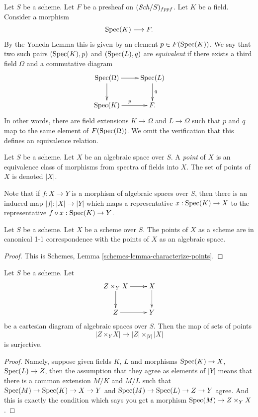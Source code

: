 \medskip\noindent
Let $S$ be a scheme.
Let $F$ be a presheaf on $(\mathit{Sch}/S)_{fppf}$.
Let $K$ be a field. Consider a morphism
$$
\mathop{\mathrm{Spec}}(K) \longrightarrow F.
$$
By the Yoneda Lemma this is given by an
element $p \in F(\mathop{\mathrm{Spec}}(K))$. We say that two such
pairs $(\mathop{\mathrm{Spec}}(K), p)$ and $(\mathop{\mathrm{Spec}}(L), q)$
are {\it equivalent} if there exists
a third field $\Omega$ and a commutative diagram
$$
\xymatrix{
\Spec(\Omega) \ar[r] \ar[d] &
\Spec(L) \ar[d]^q \\
\Spec(K) \ar[r]^p &
F.
}
$$
In other words, there are field extensions
$K \to \Omega$ and $L \to \Omega$ such that
$p$ and $q$ map to the same element
of $F(\mathop{\mathrm{Spec}}(\Omega))$. We omit the verification that this
defines an equivalence relation.

\begin{definition}
\label{definition-points}
Let $S$ be a scheme. Let $X$ be an algebraic space over $S$.
A {\it point} of $X$ is an equivalence class of morphisms
from spectra of fields into $X$.
The set of points of $X$ is denoted $|X|$.
\end{definition}

\noindent
Note that if $f : X \to Y$ is a morphism of algebraic spaces
over $S$, then there is an induced map $|f| : |X| \to |Y|$ which
maps a representative $x : \mathop{\mathrm{Spec}}(K) \to X$ to the representative
$f \circ x : \mathop{\mathrm{Spec}}(K) \to Y$.

\begin{lemma}
\label{lemma-scheme-points}
Let $S$ be a scheme. Let $X$ be a scheme over $S$.
The points of $X$ as a scheme are in canonical 1-1 correspondence
with the points of $X$ as an algebraic space.
\end{lemma}

\begin{proof}
This is Schemes, Lemma \ref{schemes-lemma-characterize-points}.
\end{proof}

\begin{lemma}
\label{lemma-points-cartesian}
Let $S$ be a scheme. Let
$$
\xymatrix{
Z \times_Y X \ar[r] \ar[d] & X \ar[d] \\
Z \ar[r] & Y
}
$$
be a cartesian diagram of algebraic spaces over $S$. Then the map of sets
of points
$$
|Z \times_Y X|
\longrightarrow
|Z| \times_{|Y|} |X|
$$
is surjective.
\end{lemma}

\begin{proof}
Namely, suppose given fields $K$, $L$ and morphisms
$\mathop{\mathrm{Spec}}(K) \to X$, $\mathop{\mathrm{Spec}}(L) \to Z$, then the
assumption that they agree as elements of $|Y|$ means that
there is a common extension $M/K$ and $M/L$
such that
$\mathop{\mathrm{Spec}}(M) \to \mathop{\mathrm{Spec}}(K) \to X \to Y$ and
$\mathop{\mathrm{Spec}}(M) \to \mathop{\mathrm{Spec}}(L) \to Z \to Y$ agree.
And this is exactly the condition which says you get a
morphism $\mathop{\mathrm{Spec}}(M) \to Z \times_Y X$.
\end{proof}

